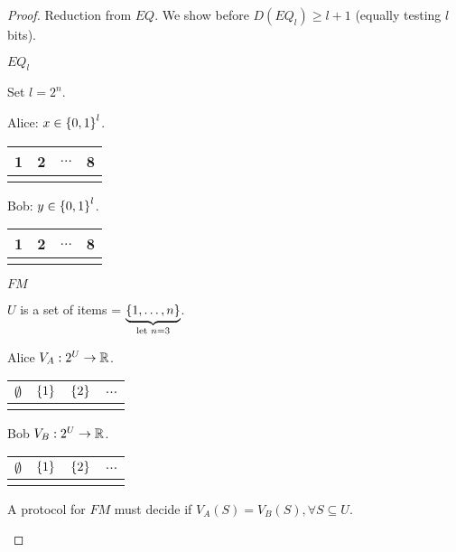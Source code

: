 \begin{proof}
    Reduction from $EQ$. We show before $D(EQ_l) \geq l + 1$ (equally testing $l$ bits).

    \begin{multicols}{2}
        $EQ_l$

        Set $l = 2^n$.

        Alice: $x \in \left \{ 0, 1 \right \}^l$.

        \begin{tabular}{ |c|c|c|c|}
            \hline
            1 & 2 & $\ldots$ & 8\\
            \hline
             & & &\\
            \hline
        \end{tabular}

        Bob: $y \in \left \{ 0, 1 \right \}^l$.

        \begin{tabular}{ |c|c|c|c|}
            \hline
            1 & 2 & $\ldots$ & 8\\
            \hline
             & & &\\
            \hline
        \end{tabular}

        \columnbreak

        $FM$

        $U$ is a set of items = $\underbrace{\left \{ 1, \ldots, n \right \}}_{\text{let } n = 3}$.

        Alice $V_A: 2^U \rightarrow \mathbb{R}$.

        \begin{tabular}{ |c|c|c|c|}
            \hline
            $\emptyset$ & $\left \{ 1 \right \}$ & $\left \{ 2 \right \}$ & $\ldots$\\
            \hline
             & & &\\
            \hline
        \end{tabular}

        Bob $V_B: 2^U \rightarrow \mathbb{R}$.

        \begin{tabular}{ |c|c|c|c|}
            \hline
            $\emptyset$ & $\left \{ 1 \right \}$ & $\left \{ 2 \right \}$ & $\ldots$\\
            \hline
             & & &\\
            \hline
        \end{tabular}

        A protocol for $FM$ must decide if $V_A(S) = V_B(S), \forall S \subseteq U$.
    \end{multicols}


\end{proof}
